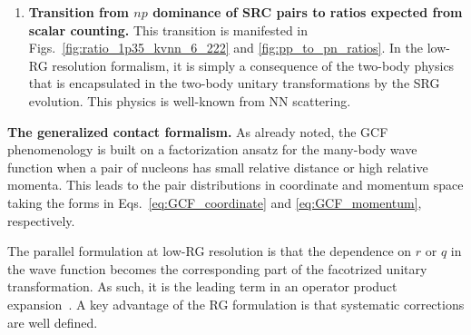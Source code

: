 \documentclass[10pt,aps,prc,floatfix,twocolumn,nofootinbib]{revtex4-1}
\begin{document}
\begin{enumerate}
  \item \textbf{Transition from $np$ dominance of SRC pairs to ratios expected from scalar counting.}
   This transition is manifested in Figs.~\ref{fig:ratio_1p35_kvnn_6_222} and \ref{fig:pp_to_pn_ratios}.
   In the low-RG resolution formalism, it is simply a consequence of the two-body physics that is encapsulated in the two-body unitary transformations by the SRG evolution.
   This physics is well-known from NN scattering.

\end{enumerate}

\textbf{The generalized contact formalism.}
%
As already noted, the GCF phenomenology is built on
a factorization ansatz for the many-body wave function  when a pair of nucleons has small relative distance or high relative momenta.
This leads to the pair distributions in coordinate and momentum space taking the forms in Eqs.~\eqref{eq:GCF_coordinate} and \eqref{eq:GCF_momentum}, respectively.

The parallel formulation at low-RG resolution is that the dependence on $r$ or $q$ in the wave function becomes the corresponding part of the facotrized unitary transformation.
As such, it is the leading term in an operator product expansion~\cite{Anderson:2010aq,Bogner:2012zm,Tropiano:2020zwb}.
A key advantage of the RG formulation is that systematic corrections are well defined.
\end{document}
